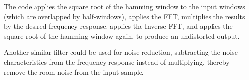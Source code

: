 The code applies the square root of the hamming window to the input windows
(which are overlapped by half-windows), applies the FFT, multiplies the results
by the desired frequency response, applies the Inverse-FFT, and applies the
square root of the hamming window again, to produce an undistorted output.

Another similar filter could be used for noise reduction, subtracting the
noise characteristics from the frequency response instead of multiplying,
thereby remove the room noise from the input sample.
